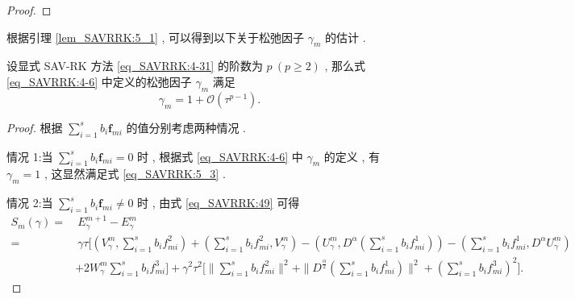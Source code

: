 \begin{proof}
\end{proof}

根据引理 \ref{lem_SAVRRK:5_1} , 可以得到以下关于松弛因子 $\gamma_m$ 的估计 . 

\begin{theorem}\label{thm_SAVRRK:5_1}
设显式 SAV-RK 方法 \eqref{eq_SAVRRK:4-31} 的阶数为 $p~(p \geq 2)$ , 那么式 \eqref{eq_SAVRRK:4-6} 中定义的松弛因子 $\gamma_m$ 满足
\begin{equation}\label{eq_SAVRRK:5_3}
\gamma_m=1+\mathcal{O}(\tau^{p-1}) . 
\end{equation}
\end{theorem}	

\begin{proof}
根据 $\sum\limits_{i=1}^s b_i \bm{f}_{m i}$ 的值分别考虑两种情况 . 

情况 1:当 $\sum\limits_{i=1}^s b_i \bm{f}_{m i} = 0$ 时 , 根据式 \eqref{eq_SAVRRK:4-6} 中 $\gamma_m$ 的定义 , 有 $\gamma_m = 1$ , 这显然满足式 \eqref{eq_SAVRRK:5_3} . 

情况 2:当 $\sum\limits_{i=1}^s b_i \bm{f}_{m i} \neq 0$ 时 , 由式 \eqref{eq_SAVRRK:49} 可得
\begin{align}\label{eq_SAVRRK:5_4a}
	S_m(\gamma)=&~E_{\gamma}^{m+1}-E_{\gamma}^{m}\nonumber\\
	=&~\gamma\tau\Big[(V_{\gamma}^{m} , \sum\limits_{i=1}^{s}b_if_{mi}^2)+(\sum\limits_{i=1}^{s}b_if_{mi}^2 , V_{\gamma}^{m})-(U_{\gamma}^{m} , D^{\alpha} (\sum\limits_{i=1}^{s}b_if_{mi}^1))-(\sum\limits_{i=1}^{s}b_if_{mi}^1 , D^{\alpha} U_{\gamma}^{m})\nonumber\\
	&+2W_{\gamma}^{m}\sum\limits_{i=1}^{s}b_if_{mi}^3\Big]+\gamma^2\tau^2\Big[\|\sum\limits_{i=1}^{s}b_if_{mi}^2\|^2+ \|D^\frac{\alpha}{2}(\sum\limits_{i=1}^{s}b_if_{mi}^1)\|^2+(\sum\limits_{i=1}^{s}b_if_{mi}^3)^2\Big] . 
\end{align}


\end{proof}
